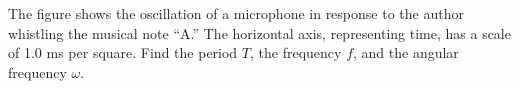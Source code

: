 The figure shows the oscillation of a microphone in response to the
        author whistling the musical note ``A.'' The horizontal axis, representing
        time, has a scale of 1.0 ms per square. Find the period $T$, the frequency $f$, and
         the angular frequency $\omega$.\answercheck
